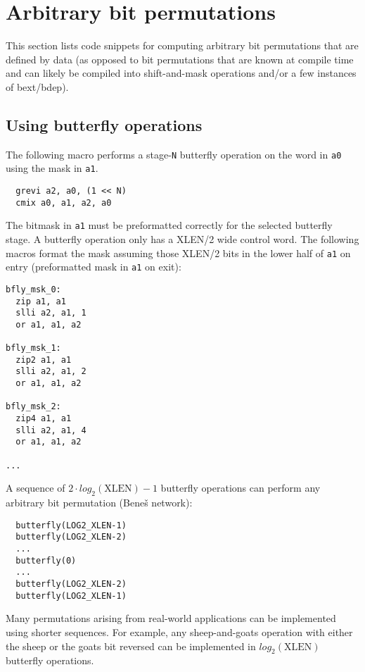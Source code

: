 
\section{Arbitrary bit permutations}

This section lists code snippets for computing arbitrary bit permutations that
are defined by data (as opposed to bit permutations that are known at compile
time and can likely be compiled into shift-and-mask operations and/or a few
instances of bext/bdep).

\subsection{Using butterfly operations}
\label{butterfly}

The following macro performs a stage-{\tt N} butterfly operation on the word in
{\tt a0} using the mask in {\tt a1}.

\begin{verbatim}
  grevi a2, a0, (1 << N)
  cmix a0, a1, a2, a0
\end{verbatim}

The bitmask in {\tt a1} must be preformatted correctly for the selected butterfly
stage. A butterfly operation only has a XLEN/2 wide control word. The following
macros format the mask assuming those XLEN/2 bits in the lower half of {\tt a1}
on entry (preformatted mask in {\tt a1} on exit):

\begin{verbatim}
bfly_msk_0:
  zip a1, a1
  slli a2, a1, 1
  or a1, a1, a2

bfly_msk_1:
  zip2 a1, a1
  slli a2, a1, 2
  or a1, a1, a2

bfly_msk_2:
  zip4 a1, a1
  slli a2, a1, 4
  or a1, a1, a2

...
\end{verbatim}

A sequence of $2\cdot{}log_2(\textrm{XLEN})-1$ butterfly operations can perform any
arbitrary bit permutation (Bene{\v s} network):

\begin{verbatim}
  butterfly(LOG2_XLEN-1)
  butterfly(LOG2_XLEN-2)
  ...
  butterfly(0)
  ...
  butterfly(LOG2_XLEN-2)
  butterfly(LOG2_XLEN-1)
\end{verbatim}


Many permutations arising from real-world applications can be implemented
using shorter sequences. For example, any sheep-and-goats operation with either
the sheep or the goats bit reversed can be implemented in $log_2(\textrm{XLEN})$
butterfly operations.

